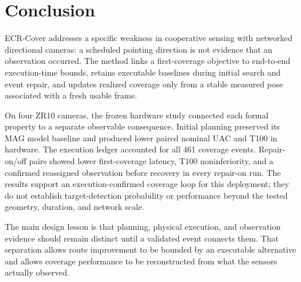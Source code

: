 \section{Conclusion}\label{sec:conclusion}

ECR-Cover addresses a specific weakness in cooperative sensing with networked directional cameras: a scheduled pointing direction is not evidence that an observation occurred. The method links a first-coverage objective to end-to-end execution-time bounds, retains executable baselines during initial search and event repair, and updates realized coverage only from a stable measured pose associated with a fresh usable frame.

On four ZR10 cameras, the frozen hardware study connected each formal property to a separate observable consequence. Initial planning preserved its MAG model baseline and produced lower paired nominal UAC and T100 in hardware. The execution ledger accounted for all 461 coverage events. Repair-on/off pairs showed lower first-coverage latency, T100 noninferiority, and a confirmed reassigned observation before recovery in every repair-on run. The results support an execution-confirmed coverage loop for this deployment; they do not establish target-detection probability or performance beyond the tested geometry, duration, and network scale.

The main design lesson is that planning, physical execution, and observation evidence should remain distinct until a validated event connects them. That separation allows route improvement to be bounded by an executable alternative and allows coverage performance to be reconstructed from what the sensors actually observed.

